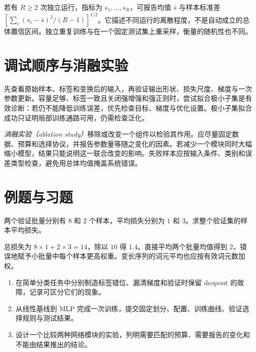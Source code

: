 若有 $R\geq2$ 次独立运行，指标为 $s_1,\ldots,s_R$，可报告均值 $\bar s$ 与样本标准差 $[\sum_r(s_r-\bar s)^2/(R-1)]^{1/2}$。它描述不同运行的离散程度，不是自动成立的总体置信区间。独立重复训练与在一个固定测试集上重采样，衡量的随机性也不同。

\section{调试顺序与消融实验}
先查看原始样本、标签和变换后的输入，再验证输出形状、损失尺度、梯度与一次参数更新。容量足够、标签一致且关闭强增强和强正则时，尝试拟合极小子集是有效诊断：若仍不能降低训练误差，优先检查目标、梯度与优化设置。极小子集拟合成功只证明局部训练通路可用，仍需检查泛化。

\emph{消融实验（ablation study）}移除或改变一个组件以检验其作用。应尽量固定数据、预算和选择协议，并报告参数量等随之变化的因素。若减少一个模块同时大幅缩小模型，结果只能说明这一联合改变的影响。失败样本应按输入条件、类别和误差类型检查，避免用总体均值掩盖系统错误。

\section{例题与习题}
\begin{example}[正确汇总不等大小批量]
两个验证批量分别有 $8$ 和 $2$ 个样本，平均损失分别为 $1$ 和 $3$。求整个验证集的样本平均损失。
\end{example}
\begin{solve}
总损失为 $8\times1+2\times3=14$，除以 $10$ 得 $1.4$。直接平均两个批量均值得到 $2$，错误地赋予小批量中每个样本更高权重。变长序列的词元平均也应按有效词元数加权。
\end{solve}
\begin{enumerate}
\item 在简单分类任务中分别制造标签错位、漏清梯度和验证时保留 dropout 的故障，记录可区分它们的现象。
\item 从线性基线到 MLP 完成一次训练，提交固定划分、配置、训练曲线、验证选择规则与测试结果。
\item 设计一个比较两种网络模块的实验，列明需要匹配的预算、需要报告的变化和不能由结果推出的结论。
\end{enumerate}

